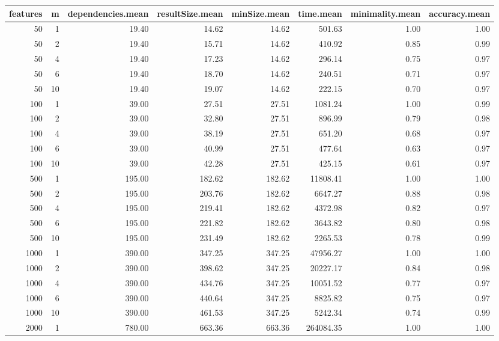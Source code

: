 \begin{table}[ht]
\centering
\begin{tabular}{rrrrrrrr}
  \hline
features & m & dependencies.mean & resultSize.mean & minSize.mean & time.mean & minimality.mean & accuracy.mean \\ 
  \hline
 50 &   1 & 19.40 & 14.62 & 14.62 & 501.63 & 1.00 & 1.00 \\ 
   50 &   2 & 19.40 & 15.71 & 14.62 & 410.92 & 0.85 & 0.99 \\ 
   50 &   4 & 19.40 & 17.23 & 14.62 & 296.14 & 0.75 & 0.97 \\ 
   50 &   6 & 19.40 & 18.70 & 14.62 & 240.51 & 0.71 & 0.97 \\ 
   50 &  10 & 19.40 & 19.07 & 14.62 & 222.15 & 0.70 & 0.97 \\ 
  100 &   1 & 39.00 & 27.51 & 27.51 & 1081.24 & 1.00 & 0.99 \\ 
  100 &   2 & 39.00 & 32.80 & 27.51 & 896.99 & 0.79 & 0.98 \\ 
  100 &   4 & 39.00 & 38.19 & 27.51 & 651.20 & 0.68 & 0.97 \\ 
  100 &   6 & 39.00 & 40.99 & 27.51 & 477.64 & 0.63 & 0.97 \\ 
  100 &  10 & 39.00 & 42.28 & 27.51 & 425.15 & 0.61 & 0.97 \\ 
  500 &   1 & 195.00 & 182.62 & 182.62 & 11808.41 & 1.00 & 1.00 \\ 
  500 &   2 & 195.00 & 203.76 & 182.62 & 6647.27 & 0.88 & 0.98 \\ 
  500 &   4 & 195.00 & 219.41 & 182.62 & 4372.98 & 0.82 & 0.97 \\ 
  500 &   6 & 195.00 & 221.82 & 182.62 & 3643.82 & 0.80 & 0.98 \\ 
  500 &  10 & 195.00 & 231.49 & 182.62 & 2265.53 & 0.78 & 0.99 \\ 
  1000 &   1 & 390.00 & 347.25 & 347.25 & 47956.27 & 1.00 & 1.00 \\ 
  1000 &   2 & 390.00 & 398.62 & 347.25 & 20227.17 & 0.84 & 0.98 \\ 
  1000 &   4 & 390.00 & 434.76 & 347.25 & 10051.52 & 0.77 & 0.97 \\ 
  1000 &   6 & 390.00 & 440.64 & 347.25 & 8825.82 & 0.75 & 0.97 \\ 
  1000 &  10 & 390.00 & 461.53 & 347.25 & 5242.34 & 0.74 & 0.99 \\ 
  2000 &   1 & 780.00 & 663.36 & 663.36 & 264084.35 & 1.00 & 1.00 \\ 

\end{tabular}
\end{table}
